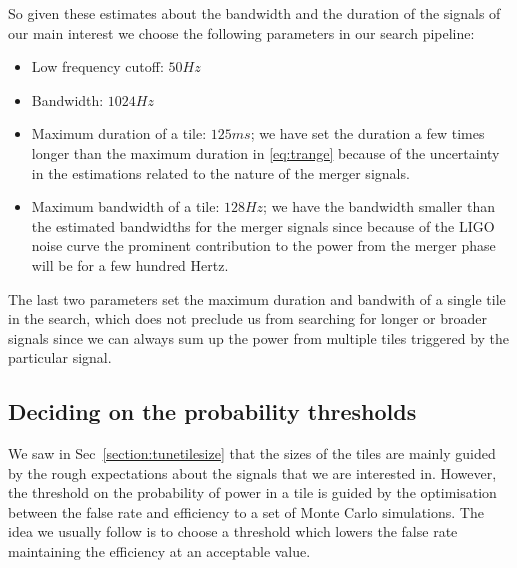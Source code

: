 \documentclass[10pt]{article}
\begin{document}
So given these estimates about the bandwidth and the duration of the 
signals of our main interest we choose the following parameters in our
search pipeline:
\begin{itemize}
\item Low frequency cutoff: $50 Hz$
\item Bandwidth: $1024 Hz$
\item Maximum duration of a tile: $125 ms$; we have set the duration 
a few times longer than the maximum duration in \eqref{eq:trange}
because of the uncertainty in the estimations related to the nature 
of the merger signals.
\item Maximum bandwidth of a tile: $128 Hz$; we have the bandwidth 
smaller than the estimated bandwidths for the merger signals since
because of the LIGO noise curve the prominent contribution to the 
power from the merger phase will be for a few hundred Hertz.
\end{itemize}
The last two parameters set the maximum duration and bandwith of 
a single tile in the search,  which does not preclude us from searching
for longer or broader signals since we can always sum up the power
from multiple tiles triggered by the particular signal. 
    

\subsection{Deciding on the probability thresholds}


We saw in Sec~\ref{section:tunetilesize} that the sizes of the tiles
are mainly guided by the rough expectations about the signals that 
we are interested in.  However, the threshold on the probability
of power in a tile is guided by the optimisation between the false 
rate and efficiency to a set of Monte Carlo simulations.  The idea
we usually follow is to choose a threshold which lowers the false rate 
maintaining the efficiency at an acceptable value.
\end{document}
